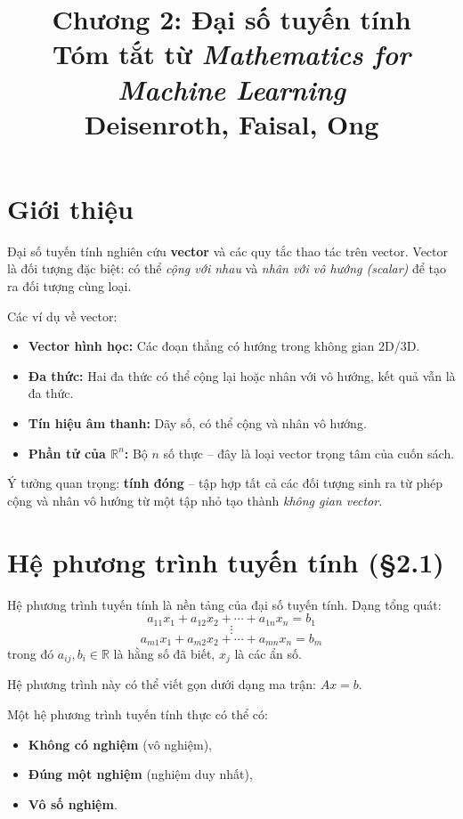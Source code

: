 \documentclass[12pt,a4paper]{article}
\title{\textbf{Chương 2: Đại số tuyến tính}\\[4pt]
\large Tóm tắt từ \textit{Mathematics for Machine Learning}\\
\normalsize Deisenroth, Faisal, Ong}
\author{}
\date{}
\begin{document}
\maketitle
\tableofcontents
\newpage

\section{Giới thiệu}

Đại số tuyến tính nghiên cứu \textbf{vector} và các quy tắc thao tác trên vector. Vector là đối tượng đặc biệt: có thể \emph{cộng với nhau} và \emph{nhân với vô hướng (scalar)} để tạo ra đối tượng cùng loại.

Các ví dụ về vector:
\begin{itemize}
  \item \textbf{Vector hình học:} Các đoạn thẳng có hướng trong không gian 2D/3D.
  \item \textbf{Đa thức:} Hai đa thức có thể cộng lại hoặc nhân với vô hướng, kết quả vẫn là đa thức.
  \item \textbf{Tín hiệu âm thanh:} Dãy số, có thể cộng và nhân vô hướng.
  \item \textbf{Phần tử của $\mathbb{R}^n$:} Bộ $n$ số thực -- đây là loại vector trọng tâm của cuốn sách.
\end{itemize}

Ý tưởng quan trọng: \textbf{tính đóng} -- tập hợp tất cả các đối tượng sinh ra từ phép cộng và nhân vô hướng từ một tập nhỏ tạo thành \emph{không gian vector}.

\section{Hệ phương trình tuyến tính (§2.1)}

Hệ phương trình tuyến tính là nền tảng của đại số tuyến tính. Dạng tổng quát:
\[
  a_{11}x_1 + a_{12}x_2 + \cdots + a_{1n}x_n = b_1
\]
\[
  \vdots
\]
\[
  a_{m1}x_1 + a_{m2}x_2 + \cdots + a_{mn}x_n = b_m
\]
trong đó $a_{ij}, b_i \in \mathbb{R}$ là hằng số đã biết, $x_j$ là các ẩn số.

Hệ phương trình này có thể viết gọn dưới dạng ma trận: $Ax = b$.

\begin{luuy}
Một hệ phương trình tuyến tính thực có thể có:
\begin{itemize}
  \item \textbf{Không có nghiệm} (vô nghiệm),
  \item \textbf{Đúng một nghiệm} (nghiệm duy nhất),
  \item \textbf{Vô số nghiệm}.
\end{itemize}
\end{luuy}
\end{document}
